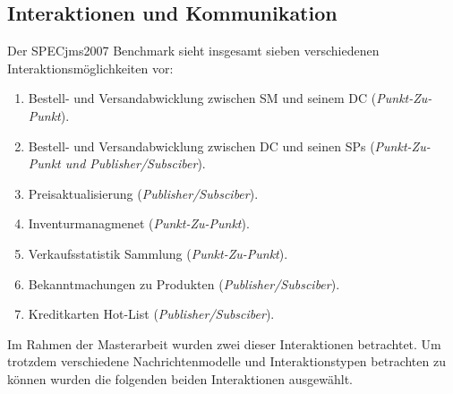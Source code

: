 \subsection{Interaktionen und Kommunikation}
Der SPECjms2007 Benchmark sieht insgesamt sieben verschiedenen Interaktionsmöglichkeiten vor: 
\begin{enumerate}
    \item Bestell- und Versandabwicklung zwischen SM und seinem DC (\emph{Punkt-Zu-Punkt}).
    \item Bestell- und Versandabwicklung zwischen DC und seinen SPs (\emph{Punkt-Zu-Punkt und Publisher/Subsciber}).
    \item Preisaktualisierung (\emph{Publisher/Subsciber}).
    \item Inventurmanagmenet (\emph{Punkt-Zu-Punkt}).
    \item Verkaufsstatistik Sammlung (\emph{Punkt-Zu-Punkt}).
    \item Bekanntmachungen zu Produkten (\emph{Publisher/Subsciber}).
    \item Kreditkarten Hot-List (\emph{Publisher/Subsciber}).
    
\end{enumerate}
Im Rahmen der Masterarbeit wurden zwei dieser Interaktionen betrachtet. Um trotzdem verschiedene Nachrichtenmodelle und Interaktionstypen betrachten zu können wurden die folgenden beiden Interaktionen ausgewählt.
